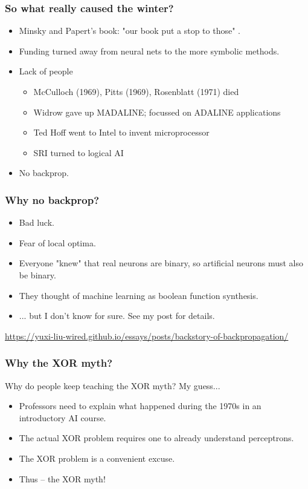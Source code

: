 \documentclass{beamer}
\begin{document}
\begin{frame}
\frametitle{So what really caused the winter?}

\begin{itemize}
    \item Minsky and Papert's book: "our book put a stop to those" \cite{bernsteinMarvinMinskyVision1981}.
    \item Funding turned away from neural nets to the more symbolic methods.
    \item Lack of people
    \begin{itemize}
        \item McCulloch (1969), Pitts (1969), Rosenblatt (1971) died
        \item Widrow gave up MADALINE; focussed on ADALINE applications
        \item Ted Hoff went to Intel to invent microprocessor
        \item SRI turned to logical AI
    \end{itemize}
    \item No backprop.
\end{itemize}

\end{frame}

\begin{frame}
\frametitle{Why no backprop?}

\begin{itemize}
    \item Bad luck.
    \item Fear of local optima.
    \item Everyone "knew" that real neurons are binary, so artificial neurons must also be binary.
    \item They thought of machine learning as boolean function synthesis.
    \item ... but I don't know for sure. See my post for details.
\end{itemize}

\small{\url{https://yuxi-liu-wired.github.io/essays/posts/backstory-of-backpropagation/}}

\end{frame}

\begin{frame}
    \frametitle{Why the XOR myth?}
    Why do people keep teaching the XOR myth? My guess...
    \begin{itemize}
        \item Professors need to explain what happened during the 1970s in an introductory AI course.
        \item The actual XOR problem requires one to already understand perceptrons.
        \item The XOR problem is a convenient excuse.
        \item Thus -- the XOR myth!
    \end{itemize}
\end{frame}
\end{document}

